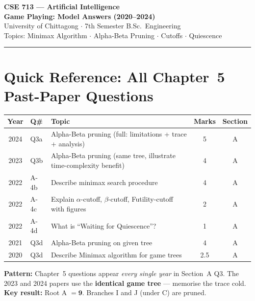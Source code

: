 \documentclass[12pt, a4paper]{article}
\newenvironment{notesbox}{\begin{mdframed}[style=notesframe]}{\end{mdframed}}
\begin{document}

\begin{center}
  {\LARGE\bfseries\color{sectionblue} CSE 713 --- Artificial Intelligence}\\[4pt]
  {\large\bfseries Game Playing: Model Answers (2020--2024)}\\[2pt]
  {\normalsize University of Chittagong $\cdot$ 7th Semester B.Sc.\ Engineering}\\[2pt]
  {\small Topics: Minimax Algorithm $\cdot$ Alpha-Beta Pruning $\cdot$ Cutoffs $\cdot$ Quiescence}
\end{center}
\vspace{6pt}
\hrule
\vspace{10pt}

\tableofcontents
\newpage

\section*{Quick Reference: All Chapter~5 Past-Paper Questions}

\begin{center}
\begin{tabular}{cllcc}
\toprule
\textbf{Year} & \textbf{Q\#} & \textbf{Topic} & \textbf{Marks} & \textbf{Section}\\
\midrule
2024 & Q3a   & Alpha-Beta pruning (full: limitations + trace + analysis) & 5 & A\\
2023 & Q3b   & Alpha-Beta pruning (same tree, illustrate time-complexity benefit) & 4 & A\\
2022 & A-4b  & Describe minimax search procedure & 4 & A\\
2022 & A-4c  & Explain $\alpha$-cutoff, $\beta$-cutoff, Futility-cutoff with figures & 2 & A\\
2022 & A-4d  & What is ``Waiting for Quiescence''? & 1 & A\\
2021 & Q3d   & Alpha-Beta pruning on given tree & 4 & A\\
2020 & Q3d   & Describe Minimax algorithm for game trees & 2.5 & A\\
\bottomrule
\end{tabular}
\end{center}

\begin{notesbox}
\textbf{Pattern:} Chapter~5 questions appear \textit{every single year} in Section~A Q3.
The 2023 and 2024 papers use the \textbf{identical game tree} --- memorise the trace cold.
\textbf{Key result:} Root A $= \mathbf{9}$. Branches I and J (under C) are pruned.
\end{notesbox}
\end{document}
